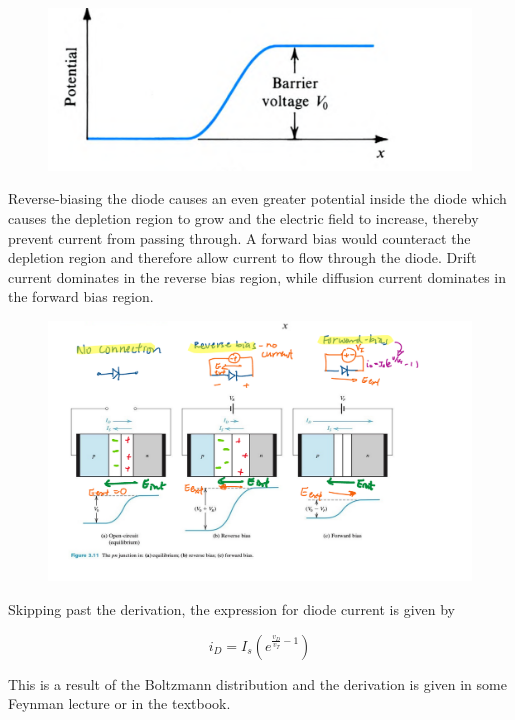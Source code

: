 \documentclass[../notes.tex]{subfiles}
\begin{document}
\begin{figure}[H]
	\centering
	\includegraphics[width=0.8\linewidth]{img/image_2022-10-19-20-11-10.png}
\end{figure}


Reverse-biasing the diode causes an even greater potential inside the diode which causes the depletion region to grow and the electric field to increase, thereby prevent current from passing through.
A forward bias would counteract the depletion region and therefore allow current to flow through the diode.
Drift current dominates in the reverse bias region, while diffusion current dominates in the forward bias region.

\begin{figure}[H]
	\centering
	\includegraphics[width=0.8\linewidth]{img/image_2022-10-19-20-12-51.png}
\end{figure}

Skipping past the derivation, the expression for diode current is given by


\begin{equation}
	i_D = I_s (e^{\frac{v_D}{v_T} - 1})
\end{equation}


This is a result of the Boltzmann distribution and the derivation is given in some Feynman lecture or in the textbook.
\end{document}
